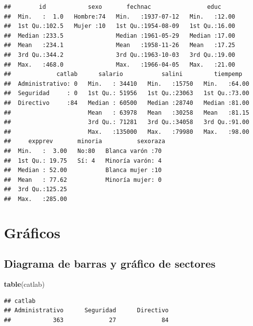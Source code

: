 \documentclass[]{book}
\newenvironment{Shaded}{\begin{snugshade}}{\end{snugshade}}
\newcommand{\KeywordTok}[1]{\textcolor[rgb]{0.13,0.29,0.53}{\textbf{#1}}}
\newcommand{\NormalTok}[1]{#1}
\begin{document}
\begin{verbatim}
##        id            sexo       fechnac                educ      
##  Min.   :  1.0   Hombre:74   Min.   :1937-07-12   Min.   :12.00  
##  1st Qu.:102.5   Mujer :10   1st Qu.:1954-08-09   1st Qu.:16.00  
##  Median :233.5               Median :1961-05-29   Median :17.00  
##  Mean   :234.1               Mean   :1958-11-26   Mean   :17.25  
##  3rd Qu.:344.2               3rd Qu.:1963-10-03   3rd Qu.:19.00  
##  Max.   :468.0               Max.   :1966-04-05   Max.   :21.00  
##             catlab      salario           salini         tiempemp    
##  Administrativo: 0   Min.   : 34410   Min.   :15750   Min.   :64.00  
##  Seguridad     : 0   1st Qu.: 51956   1st Qu.:23063   1st Qu.:73.00  
##  Directivo     :84   Median : 60500   Median :28740   Median :81.00  
##                      Mean   : 63978   Mean   :30258   Mean   :81.15  
##                      3rd Qu.: 71281   3rd Qu.:34058   3rd Qu.:91.00  
##                      Max.   :135000   Max.   :79980   Max.   :98.00  
##     expprev       minoria          sexoraza 
##  Min.   :  3.00   No:80   Blanca varón :70  
##  1st Qu.: 19.75   Sí: 4   Minoría varón: 4  
##  Median : 52.00           Blanca mujer :10  
##  Mean   : 77.62           Minoría mujer: 0  
##  3rd Qu.:125.25                             
##  Max.   :285.00
\end{verbatim}

\hypertarget{graficos-1}{%
\section{Gráficos}\label{graficos-1}}

\hypertarget{diagrama-de-barras-y-grafico-de-sectores}{%
\subsection{Diagrama de barras y gráfico de sectores}\label{diagrama-de-barras-y-grafico-de-sectores}}

\begin{Shaded}
\begin{Highlighting}[]
\KeywordTok{table}\NormalTok{(catlab)}
\end{Highlighting}
\end{Shaded}

\begin{verbatim}
## catlab
## Administrativo      Seguridad      Directivo 
##            363             27             84
\end{verbatim}
\end{document}
